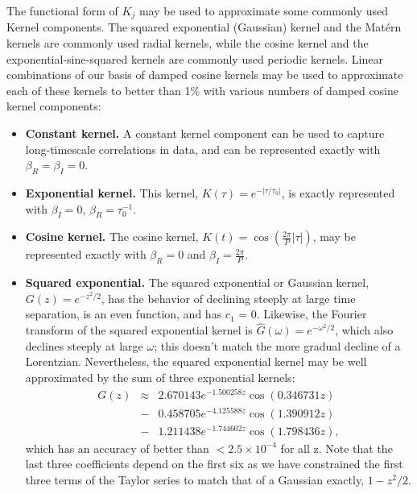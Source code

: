 \documentclass[manuscript, letterpaper]{aastex6}
\begin{document}
The functional form of $K_j$ may be used to approximate some commonly used Kernel components.
The squared exponential (Gaussian) kernel and the Mat\'ern kernels are commonly
used radial kernels, while the cosine kernel and the exponential-sine-squared kernels are
commonly used periodic kernels.  Linear combinations of our basis of damped cosine kernels may be
used to approximate each of these kernels to better than 1\% with various numbers of damped
cosine kernel components:
\begin{itemize}
\item {\bf Constant kernel.} A constant kernel component can be used to capture long-timescale
correlations in data, and can be represented exactly with $\beta_R = \beta_I =  0$.
\item {\bf Exponential kernel.} This kernel, $K(\tau) = e^{-\vert \tau/\tau_0\vert}$, is exactly
represented with $\beta_I=0$, $\beta_R = \tau_0^{-1}$.
\item {\bf Cosine kernel.} The cosine kernel, $K(t) = \cos{\left(\frac{2\pi}{P} \vert \tau \vert\right)}$,
may be represented exactly with $\beta_R=0$ and $\beta_I = \frac{2\pi}{P}$.
\item {\bf Squared exponential.} The squared exponential or Gaussian kernel, $G(z)=e^{-z^2/2}$,
has the behavior of declining steeply at large time separation, is an even function, and has $c_1$ = 0.
Likewise, the Fourier transform of the squared exponential kernel is $\hat G(\omega) = e^{-\omega^2/2}$,
which also declines steeply at large $\omega$;  this doesn't match the more gradual decline of a
Lorentzian.  Nevertheless, the squared exponential kernel may be well approximated by the sum of
three exponential kernels:
\begin{eqnarray}
G(z) &\approx& 2.670143 e^{-1.500258 z} \cos{(0.346731 z)} \\
 &-& 0.458705 e^{-4.125588 z} \cos{(1.390912 z)}\\
 &-& 1.211438 e^{-1.744602 z} \cos{(1.798436 z)},
\end{eqnarray}
which has an accuracy of better than $<2.5\times 10^{-4}$ for all z.
Note that the last three coefficients depend on the first six as we have constrained
the first three terms of the Taylor series to match that of a Gaussian exactly, $1-z^2/2$.

\end{itemize}
\end{document}
